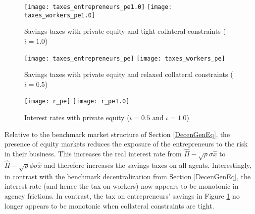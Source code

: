 \documentclass[11pt]{article}
\theoremstyle{plain}
\theoremstyle{definition} %
\begin{document}
\begin{figure}[H]
\centering
\texttt{[image: taxes\_entrepreneurs\_pe1.0]}
\texttt{[image: taxes\_workers\_pe1.0]}
\caption{Savings taxes with private equity and tight collateral constraints ($\overline{\iota} = 1.0$)}
\label{tax_pe1.0} 
\end{figure} 

\begin{figure}[H]
\centering
\texttt{[image: taxes\_entrepreneurs\_pe]}
\texttt{[image: taxes\_workers\_pe]}
\caption{Savings taxes with private equity and relaxed collateral constraints ($\overline{\iota} = 0.5$)}
\label{tax_pe} 
\end{figure} 

\begin{figure}[H]
\centering
\texttt{[image: r\_pe]}
\texttt{[image: r\_pe1.0]}
\caption{Interest rates with private equity ($\overline{\iota} = 0.5$ and $\overline{\iota} = 1.0$)}
\label{r_pe} 
\end{figure}

Relative to the benchmark market structure of Section \ref{DecenGenEq}, the presence of equity markets reduces the exposure of the entrepreneurs to the risk in their business. This increases the real interest rate from $\hat{\Pi} - \sqrt{\rho}\sigma \hat{x}$ to $\hat{\Pi} - \sqrt{\rho}\phi\sigma \hat{x}$ and therefore increases the savings taxes on all agents. Interestingly, in contrast with the benchmark decentralization from Section \ref{DecenGenEq}, the interest rate (and hence the tax on workers) now appears to be monotonic in agency frictions. In contrast, the tax on entrepreneurs' savings in Figure \ref{tax_pe1.0} no longer appears to be monotonic when collateral constraints are tight. 
\end{document}
